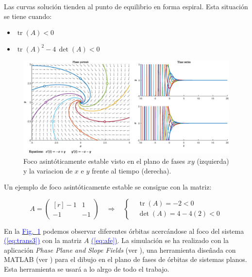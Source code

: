 \documentclass[12pt,a4paper]{report} %
\newcommand{\fref}[1]{\hyperref[#1]{\textcolor{blue}{Fig.~\ref*{#1}}}}
\newcommand{\eref}[1]{\hyperref[#1]{\textcolor{blue}{(\ref*{#1})}}}
\newcommand{\fref}[1]{\hyperref[#1]{\textcolor{blue}{\textit{Fig.~\ref*{#1}}}}}
\newcommand{\eref}[1]{\hyperref[#1]{\textcolor{blue}{\textit{(\ref*{#1})}}}}
\newcommand{\tr}{\operatorname{\textrm{tr}}}
\begin{document}
	\vspace{0.3cm}\noindent Las curvas solución tienden al punto de equilibrio en forma espiral. Esta situación se tiene cuando:
	\begin{itemize}
		\item $\tr(A)<0$
		\item $\tr(A)^2-4\, \det(A)<0$
	\end{itemize}
	
	\begin{figure}[h]
		\centering
		\includegraphics[width=1\textwidth]{estable.eps}
		\caption{Foco asintóticamente estable visto en el plano de fases $xy$ (izquierda) y la variacion de $x$ e $y$ frente al tiempo (derecha).}
		\label{fig:estable}
	\end{figure}\smallskip
	
	\vspace{0.3cm}\noindent Un ejemplo de foco asintóticamente estable se consigue con la matriz:
	
	\begin{equation}
		\label{eq:afe}
		A=\begin{pmatrix*}[r]
			-1 & 1 \\
			-1 & -1
		\end{pmatrix*} \quad \Longrightarrow \quad 
		\left\{ 
		\begin{aligned}
			&\tr(A)=-2<0 \\[2mm]
			&\det(A)=4-4(2)<0
		\end{aligned}
		 \right.
	\end{equation}\smallskip
	
	\noindent En la \fref{fig:estable} podemos observar diferentes órbitas acercándose al foco del sistema \eref{eq:trans3} con la matriz $A$ \eref{eq:afe}. La simulación se ha realizado con la aplicación \textit{Phase Plane and Slope Fields} (ver \cite{phaseplane}), una herramienta diseñada con MATLAB (ver \cite{clevermoller}) para el dibujo en el plano de fases de órbitas de sistemas planos. Esta herramienta se usará a lo alrgo de todo el trabajo.
	
\end{document}

